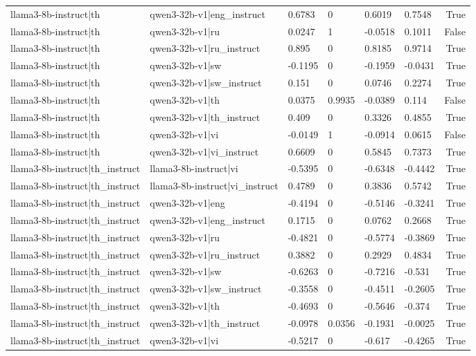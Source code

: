 \begin{table}
\begin{tabular}{llllllr}
llama3-8b-instruct|th & qwen3-32b-v1|eng_instruct & 0.6783 & 0 & 0.6019 & 0.7548 & True \\
llama3-8b-instruct|th & qwen3-32b-v1|ru & 0.0247 & 1 & -0.0518 & 0.1011 & False \\
llama3-8b-instruct|th & qwen3-32b-v1|ru_instruct & 0.895 & 0 & 0.8185 & 0.9714 & True \\
llama3-8b-instruct|th & qwen3-32b-v1|sw & -0.1195 & 0 & -0.1959 & -0.0431 & True \\
llama3-8b-instruct|th & qwen3-32b-v1|sw_instruct & 0.151 & 0 & 0.0746 & 0.2274 & True \\
llama3-8b-instruct|th & qwen3-32b-v1|th & 0.0375 & 0.9935 & -0.0389 & 0.114 & False \\
llama3-8b-instruct|th & qwen3-32b-v1|th_instruct & 0.409 & 0 & 0.3326 & 0.4855 & True \\
llama3-8b-instruct|th & qwen3-32b-v1|vi & -0.0149 & 1 & -0.0914 & 0.0615 & False \\
llama3-8b-instruct|th & qwen3-32b-v1|vi_instruct & 0.6609 & 0 & 0.5845 & 0.7373 & True \\
llama3-8b-instruct|th_instruct & llama3-8b-instruct|vi & -0.5395 & 0 & -0.6348 & -0.4442 & True \\
llama3-8b-instruct|th_instruct & llama3-8b-instruct|vi_instruct & 0.4789 & 0 & 0.3836 & 0.5742 & True \\
llama3-8b-instruct|th_instruct & qwen3-32b-v1|eng & -0.4194 & 0 & -0.5146 & -0.3241 & True \\
llama3-8b-instruct|th_instruct & qwen3-32b-v1|eng_instruct & 0.1715 & 0 & 0.0762 & 0.2668 & True \\
llama3-8b-instruct|th_instruct & qwen3-32b-v1|ru & -0.4821 & 0 & -0.5774 & -0.3869 & True \\
llama3-8b-instruct|th_instruct & qwen3-32b-v1|ru_instruct & 0.3882 & 0 & 0.2929 & 0.4834 & True \\
llama3-8b-instruct|th_instruct & qwen3-32b-v1|sw & -0.6263 & 0 & -0.7216 & -0.531 & True \\
llama3-8b-instruct|th_instruct & qwen3-32b-v1|sw_instruct & -0.3558 & 0 & -0.4511 & -0.2605 & True \\
llama3-8b-instruct|th_instruct & qwen3-32b-v1|th & -0.4693 & 0 & -0.5646 & -0.374 & True \\
llama3-8b-instruct|th_instruct & qwen3-32b-v1|th_instruct & -0.0978 & 0.0356 & -0.1931 & -0.0025 & True \\
llama3-8b-instruct|th_instruct & qwen3-32b-v1|vi & -0.5217 & 0 & -0.617 & -0.4265 & True \\

\end{tabular}
\end{table}
